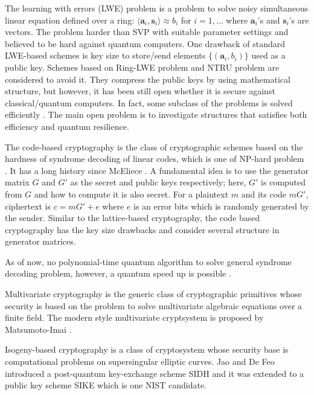 The learning with errors (LWE) problem \cite{Regev05} is a problem to solve noisy simultaneous linear equation defined over a ring: $ \langle \bm{a}_i , \bm{s}_i\rangle  \approx b_i $ for $i=1,\ldots$ where $\bm{a}_i$'s and $\bm{s}_i$'s are vectors.
The problem harder than SVP with suitable parameter settings \cite{BLPRS13} and 
believed to be hard against quantum computers.
One drawback of standard LWE-based schemes is key size to store/send elements $\{ (\bm{a}_i,b_i) \} $ used as a public key.
Schemes based on Ring-LWE problem \cite{} and NTRU problem \cite{} are considered to avoid it.
They compress the public keys by using mathematical structure, but however, 
it has been still open whether it is secure against classical/quantum computers.
In fact, some subclass of the problems is solved efficiently \cite{Duc17}.
The main open problem is to investigate structures that satisfies both efficiency and quantum resilience.


The code-based cryptography is the class of cryptographic schemes 
based on the hardness of syndrome decoding of linear codes, which is one of NP-hard problem \cite{BMvT78,Has01}.
It has a long history since McEliece \cite{McE78}.
A fundamental idea is to use the generator matrix $G$ and $G'$ as the secret and public keys respectively;
here, $G'$ is computed from $G$ and how to compute it is also secret.
For a plaintext $m$ and its code $mG'$, ciphertext is $c=mG'+e$ where $e$ is an error bits which is randomly generated by the sender.
Similar to the lattice-based cryptography, 
the code based cryptography has the key size drawbacks
and consider several structure in generator matrices.

As of now, no polynomial-time quantum algorithm to solve general syndrome decoding problem, however, a quantum speed up is possible \cite{KT17}.


Multivariate cryptography is the generic class of cryptographic primitives whose security is based on the problem to solve multivariate algebraic equations over a finite field.
The modern style multivariate cryptsystem is proposed by Matsumoto-Imai \cite{MI88}.

 
Isogeny-based cryptography is a class of cryptosystem whose security base is computational problems on supersingular elliptic curves.
Jao and De Feo introduced a post-quantum key-exchange scheme SIDH \cite{JF11}
and it was extended to a public key scheme SIKE \cite{SIKEweb} which is one NIST candidate.


